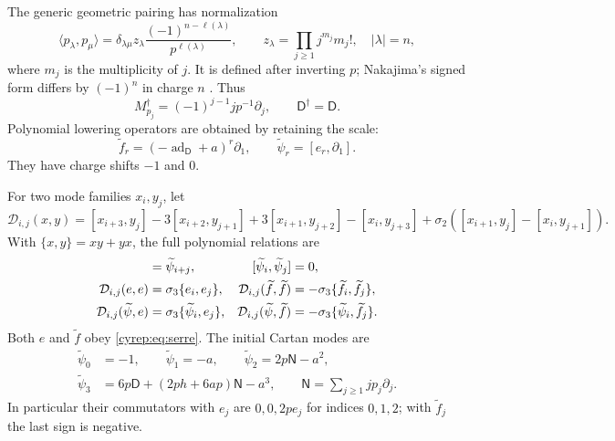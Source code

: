 The generic geometric pairing has normalization
\begin{equation}\label{cyrep:eq:fock-pairing}
 \langle p_\lambda,p_\mu\rangle
 =\delta_{\lambda\mu}z_\lambda
       \frac{(-1)^{n-\ell(\lambda)}}{p^{\ell(\lambda)}},
 \qquad
 z_\lambda=\prod_{j\geq1}j^{m_j}m_j!,\quad |\lambda|=n,
\end{equation}
where \(m_j\) is the multiplicity of \(j\).
It is defined after inverting \(p\); Nakajima's signed form
differs by \((-1)^n\) in charge \(n\)
\cite[Sections 2(i), 3(iii)]{Nakajima2014}.
Thus
\[
 M_{p_j}^{\dagger}=(-1)^{j-1}j p^{-1}\partial_j,\qquad
 \mathsf D^\dagger=\mathsf D.
\]
Polynomial lowering operators are obtained by retaining the scale:
\begin{equation}\label{cyrep:eq:scaled}
 \widetilde f_r=(-\operatorname{ad}_{\mathsf D}+a)^r\partial_1,
 \qquad \widetilde\psi_r=[e_r,\partial_1].
\end{equation}
They have charge shifts \(-1\) and \(0\).

For two mode families \(x_i,y_j\), let
\[
 \mathcal D_{i,j}(x,y)
 =[x_{i+3},y_j]-3[x_{i+2},y_{j+1}]
 +3[x_{i+1},y_{j+2}]-[x_i,y_{j+3}]
 +\sigma_2([x_{i+1},y_j]-[x_i,y_{j+1}]).
\]
With \(\{x,y\}=xy+yx\), the full polynomial relations are
\begin{align}
 [e_i,\widetilde f_j]&=\widetilde\psi_{i+j},
 &[\widetilde\psi_i,\widetilde\psi_j]&=0,\notag\\
 \mathcal D_{i,j}(e,e)&=\sigma_3\{e_i,e_j\},
 &\mathcal D_{i,j}(\widetilde f,\widetilde f)
                 &=-\sigma_3\{\widetilde f_i,\widetilde f_j\},\notag\\
 \mathcal D_{i,j}(\widetilde\psi,e)
                 &=\sigma_3\{\widetilde\psi_i,e_j\},
 &\mathcal D_{i,j}(\widetilde\psi,\widetilde f)
                 &=-\sigma_3\{\widetilde\psi_i,\widetilde f_j\}.
 \label{cyrep:eq:scaled-relations}
\end{align}
Both \(e\) and \(\widetilde f\) obey \eqref{cyrep:eq:serre}.
The initial Cartan modes are
\begin{equation}\label{cyrep:eq:low-cartan}
\begin{split}
 \widetilde\psi_0&=-1,\qquad
 \widetilde\psi_1=-a,\qquad
 \widetilde\psi_2=2p\mathsf N-a^2,\\
 \widetilde\psi_3&=6p\mathsf D+(2ph+6ap)\mathsf N-a^3,
 \qquad \mathsf N=\sum_{j\geq1}jp_j\partial_j.
\end{split}
\end{equation}
In particular their commutators with \(e_j\) are \(0,0,2pe_j\)
for indices \(0,1,2\); with \(\widetilde f_j\) the last sign
is negative.

